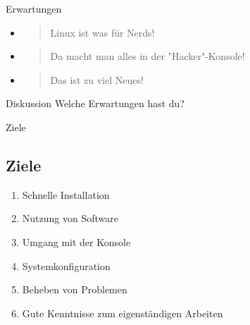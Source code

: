 \begin{frame}{Erwartungen}
    \begin{itemize}
        \item \begin{quote}
                  Linux ist was für Nerds!
        \end{quote}\pause
        \item \begin{quote}
                  Da macht man alles in der "Hacker"-Konsole!
        \end{quote}\pause
        \item \begin{quote}
                  Das ist zu viel Neues!
        \end{quote}
    \end{itemize}

    \pause
    \vspace{0.5cm}
    \begin{alertblock}{Diskussion}
        Welche Erwartungen hast du?
    \end{alertblock}

\end{frame}

\begin{frame}{Ziele}
    \subsection{Ziele}\label{subsec:ziele}

    \begin{enumerate}
        \item Schnelle Installation\pause
        \item Nutzung von Software\pause
        \item Umgang mit der Konsole\pause
        \item Systemkonfiguration\pause
        \item Beheben von Problemen\pause
        \item Gute Kenntnisse zum eigenständigen Arbeiten
    \end{enumerate}

\end{frame}